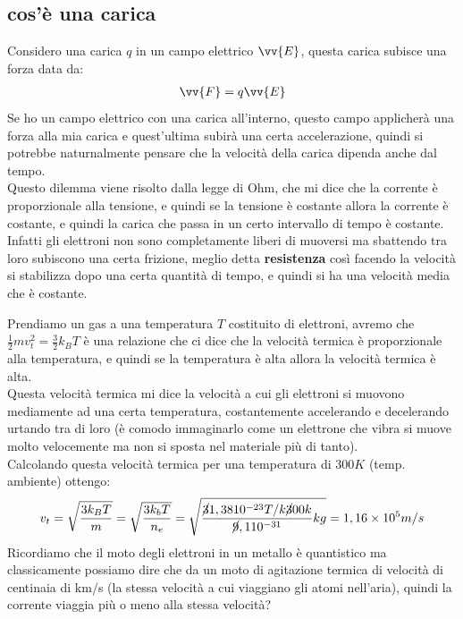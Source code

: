 \documentclass[a4paper, oneside]{article}
\begin{document}
\subsection{cos'è una carica}
Considero una carica $q$ in un campo elettrico $\vv{E}$, questa carica subisce una forza data da:
\begin{gather*}
    \vv{F} = q \vv{E}
\end{gather*}
Se ho un campo elettrico con una carica all'interno, questo campo applicherà una forza alla mia carica e quest'ultima subirà una certa accelerazione, quindi si potrebbe naturnalmente pensare che la velocità della carica dipenda anche dal tempo.\\
Questo dilemma viene risolto dalla legge di Ohm, che mi dice che la corrente è proporzionale alla tensione, e quindi se la tensione è costante allora la corrente è costante, e quindi la carica che passa in un certo intervallo di tempo è costante.\\
Infatti gli elettroni non sono completamente liberi di muoversi ma sbattendo tra loro subiscono una certa frizione, meglio detta \textbf{resistenza} così facendo la velocità si stabilizza dopo una certa quantità di tempo, e quindi si ha una velocità media che è costante.\\
\begin{example}
    Prendiamo un gas a una temperatura $T$ costituito di elettroni, avremo che $\frac{1}{2} m v_t^2 = \frac{3}{2} k_B T$ è una relazione che ci dice che la velocità termica è proporzionale alla temperatura, e quindi se la temperatura è alta allora la velocità termica è alta.\\
    Questa velocità termica mi dice la velocità a cui gli elettroni si muovono mediamente ad una certa temperatura, costantemente accelerando e decelerando urtando tra di loro (è comodo immaginarlo come un elettrone che vibra si muove molto velocemente ma non si sposta nel materiale più di tanto).\\
    Calcolando questa velocità termica per una temperatura di $300 K$ (temp. ambiente) ottengo:
    \begin{gather*}
        v_t = \sqrt{\frac{3 k_B T}{m}} = \sqrt{\frac{3 k_b T}{n_e}} = \sqrt{\frac{\cancel{3} 1,3810^{-23} T/k \cancel{3}00 k}{\cancel{9},1 10 ^{-31}}kg} = 1,16 \times 10^5 m/s
    \end{gather*}
    Ricordiamo che il moto degli elettroni in un metallo è quantistico ma classicamente possiamo dire che da un moto di agitazione termica di velocità di centinaia di km/s (la stessa velocità a cui viaggiano gli atomi nell'aria), quindi la corrente viaggia più o meno alla stessa velocità?\\ 
\end{example}
\end{document}
